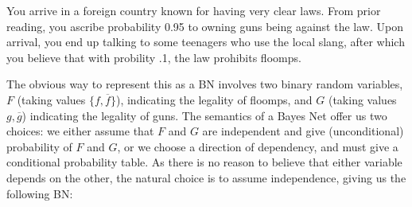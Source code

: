\documentclass{article}
\numberwithin{equation}{section}
\begin{document}
	\begin{example}\label{ex:guns-and-floomps}
		You arrive in a foreign country known for having very clear laws. From prior reading, you ascribe probability 0.95 to owning guns being against the law. Upon arrival, you end up talking to some teenagers who use the local slang, 
		after which you believe that with probility .1, the law prohibits floomps. 
		
		The obvious way to represent this as a BN involves two binary random variables, $F$ (taking values $\{f, \overline f\}$), indicating the legality of floomps, and $G$ (taking values $g, \overline g$) indicating the legality of guns. 
		The semantics of a Bayes Net offer us two choices:
		we either assume that $F$ and $G$ are independent and give
		(unconditional) probability of $F$ and $G$, or we choose a
		direction of dependency,
                and must give a conditional probability table.           
		As there is no reason to believe that either variable depends on the
		other, the natural choice is to assume independence, giving us the
		following BN:
		
		
		\begin{center}
		\end{center}
		

\end{example}
\end{document}
